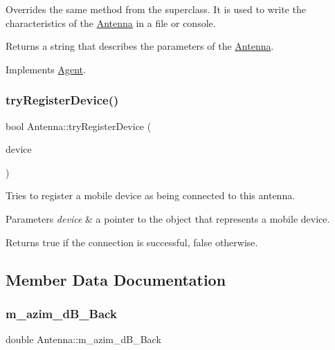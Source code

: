 Overrides the same method from the superclass. It is used to write the characteristics of the \mbox{\hyperlink{class_antenna}{Antenna}} in a file or console. \begin{DoxyReturn}{Returns}
a string that describes the parameters of the \mbox{\hyperlink{class_antenna}{Antenna}}. 
\end{DoxyReturn}


Implements \mbox{\hyperlink{class_agent_a44f291596d10c7878b0641d6ec156328}{Agent}}.

\mbox{\label{class_antenna_a4455f5c804e1ea520dd849dc9fd7b0b4}} 
\subsubsection{\texorpdfstring{tryRegisterDevice()}{tryRegisterDevice()}}
{\footnotesize\ttfamily bool Antenna\+::try\+Register\+Device (\begin{DoxyParamCaption}\item[{\mbox{\hyperlink{class_holdable_agent}{Holdable\+Agent}} $\ast$}]{device }\end{DoxyParamCaption})}

Tries to register a mobile device as being connected to this antenna. 
\begin{DoxyParams}{Parameters}
{\em device} & a pointer to the object that represents a mobile device. \\
\hline
\end{DoxyParams}
\begin{DoxyReturn}{Returns}
true if the connection is successful, false otherwise. 
\end{DoxyReturn}


\subsection{Member Data Documentation}
\mbox{\label{class_antenna_aa7ed7c0424dfd20193b550a4ececcb64}} 
\subsubsection{\texorpdfstring{m\_azim\_dB\_Back}{m\_azim\_dB\_Back}}
{\footnotesize\ttfamily double Antenna\+::m\+\_\+azim\+\_\+d\+B\+\_\+\+Back\hspace{0.3cm}{\ttfamily [private]}}

